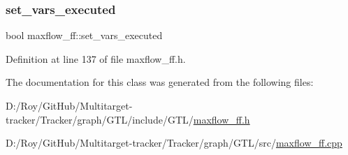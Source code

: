 \mbox{\label{classmaxflow__ff_a2551a00303d9b81ccc6b3d1f575d7956}} 
\subsubsection{\texorpdfstring{set\+\_\+vars\+\_\+executed}{set\_vars\_executed}}
{\footnotesize\ttfamily bool maxflow\+\_\+ff\+::set\+\_\+vars\+\_\+executed\hspace{0.3cm}{\ttfamily [protected]}}



Definition at line 137 of file maxflow\+\_\+ff.\+h.



The documentation for this class was generated from the following files\+:\begin{DoxyCompactItemize}
\item 
D\+:/\+Roy/\+Git\+Hub/\+Multitarget-\/tracker/\+Tracker/graph/\+G\+T\+L/include/\+G\+T\+L/\mbox{\hyperlink{maxflow__ff_8h}{maxflow\+\_\+ff.\+h}}\item 
D\+:/\+Roy/\+Git\+Hub/\+Multitarget-\/tracker/\+Tracker/graph/\+G\+T\+L/src/\mbox{\hyperlink{maxflow__ff_8cpp}{maxflow\+\_\+ff.\+cpp}}\end{DoxyCompactItemize}
